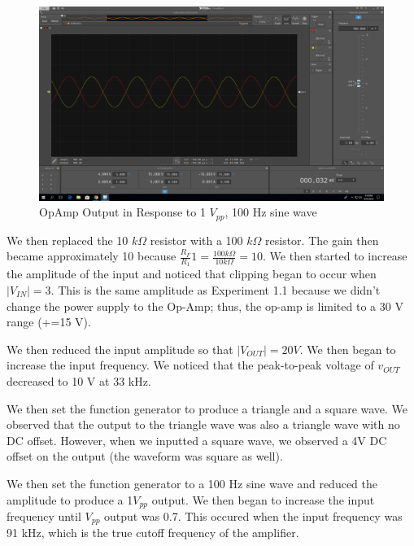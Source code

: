\documentclass[10pt]{article}
\begin{document}
\begin{centering}
	\begin{figure} [H]
		\centering
		\includegraphics[scale=0.22]{images/invertingamplifier.png}
		\caption{OpAmp Output in Response to 1 $V_{pp}$, 100 Hz sine wave}				
		\label{fig:invertingamp}
	\end{figure}
\end{centering}

We then replaced the 10 $k\Omega$ resistor with a 100 $k\Omega$ resistor. The gain then became approximately 10 because $\frac{R_F}{R_1}1 = \frac{100k\Omega}{10k\Omega} = 10$. We then started to increase the amplitude of the input and noticed that clipping began to occur when $|V_{IN}| = 3$. This is the same amplitude as Experiment 1.1 because we didn't change the power supply to the Op-Amp; thus, the op-amp is limited to a 30 V range (+=15 V).

We then reduced the input amplitude so that $|V_{OUT}| = 20V$. We then began to increase the input frequency. We noticed that the peak-to-peak voltage of $v_{OUT}$ decreased to 10 V at 33 kHz. 

\quad We then set the function generator to produce a triangle and a square wave. We observed that the output to the triangle wave was also a triangle wave with no DC offset. However, when we inputted a square wave, we observed a 4V DC offset on the output (the waveform was square as well). 

\quad We then set the function generator to a 100 Hz sine wave and reduced the amplitude to produce a 1$V_{pp}$ output. We then began to increase the input frequency until $V_{pp}$ output was 0.7. This occured when the input frequency was 91 kHz, which is the true cutoff frequency of the amplifier. \\\\
\end{document}
